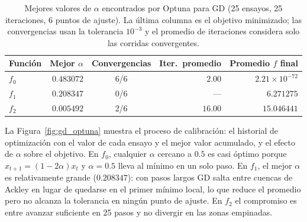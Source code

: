 \begin{table}[H]
\centering
\begin{tabular}{lrcrr}
\toprule
Función & Mejor $\alpha$ & Convergencias & Iter.\ promedio & Promedio $f$ final \\
\midrule
$f_0$ & $0.483072$ & 6/6 & $2.00$  & $2.21\times10^{-72}$ \\
$f_1$ & $0.208347$ & 0/6 & ---     & $6.271275$ \\
$f_2$ & $0.005492$ & 2/6 & $16.00$ & $15.046441$ \\
\bottomrule
\end{tabular}
\caption{Mejores valores de $\alpha$ encontrados por Optuna para GD (25
ensayos, 25 iteraciones, 6 puntos de ajuste). La última columna es el
objetivo minimizado; las convergencias usan la tolerancia $10^{-3}$ y el
promedio de iteraciones considera solo las corridas convergentes.}
\label{tab:gd_optuna}
\end{table}

La Figura~\ref{fig:gd_optuna} muestra el proceso de calibración: el
historial de optimización con el valor de cada ensayo y el mejor valor
acumulado, y el efecto de $\alpha$ sobre el objetivo. En $f_0$, cualquier
$\alpha$ cercano a $0.5$ es casi óptimo porque $x_{t+1}=(1-2\alpha)x_t$ y
$\alpha=0.5$ lleva al mínimo en un solo paso. En $f_1$, el mejor $\alpha$
es relativamente grande ($0.208347$): con pasos largos GD salta entre cuencas de Ackley
en lugar de quedarse en el primer mínimo local, lo que reduce el promedio
pero no alcanza la tolerancia en ningún punto de ajuste. En $f_2$ el
compromiso es entre avanzar suficiente en 25 pasos y no divergir en las
zonas empinadas.


